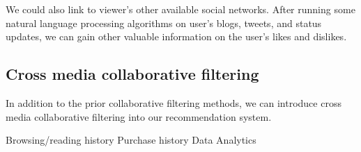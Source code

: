 We could also link to viewer’s other available social networks. After
running some natural language processing algorithms on user’s blogs,
tweets, and status updates, we can gain other valuable information on
the user’s likes and dislikes.

\subsection{Cross media collaborative filtering}
In addition to the prior collaborative filtering methods, we can
introduce cross media collaborative filtering into our recommendation
system.  

Browsing/reading history 
Purchase history 
Data Analytics
